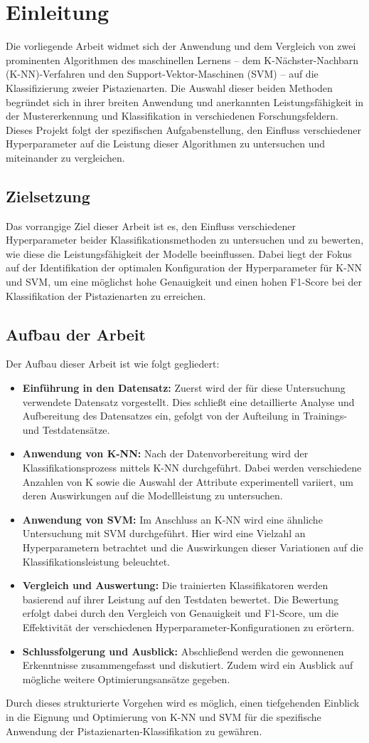 
\section{Einleitung}
Die vorliegende Arbeit widmet sich der Anwendung und dem Vergleich von zwei prominenten Algorithmen des maschinellen Lernens – dem K-Nächster-Nachbarn (K-NN)-Verfahren und den Support-Vektor-Maschinen (SVM) – auf die Klassifizierung zweier Pistazienarten.
Die Auswahl dieser beiden Methoden begründet sich in ihrer breiten Anwendung und anerkannten Leistungsfähigkeit in der Mustererkennung und Klassifikation in verschiedenen Forschungsfeldern.
Dieses Projekt folgt der spezifischen Aufgabenstellung, den Einfluss verschiedener Hyperparameter auf die Leistung dieser Algorithmen zu untersuchen und miteinander zu vergleichen.
\subsection*{Zielsetzung}
Das vorrangige Ziel dieser Arbeit ist es, den Einfluss verschiedener Hyperparameter beider Klassifikationsmethoden zu untersuchen und zu bewerten, wie diese die Leistungsfähigkeit der Modelle beeinflussen. Dabei liegt der Fokus auf der Identifikation der optimalen Konfiguration der Hyperparameter für K-NN und SVM, um eine möglichst hohe Genauigkeit und einen hohen F1-Score bei der Klassifikation der Pistazienarten zu erreichen.
\subsection*{Aufbau der Arbeit}
Der Aufbau dieser Arbeit ist wie folgt gegliedert:
\begin{itemize}
	\item \textbf{Einführung in den Datensatz:} Zuerst wird der für diese Untersuchung verwendete Datensatz vorgestellt. Dies schließt eine detaillierte Analyse und Aufbereitung des Datensatzes ein, gefolgt von der Aufteilung in Trainings- und Testdatensätze.
	\item \textbf{Anwendung von K-NN:} Nach der Datenvorbereitung wird der Klassifikationsprozess mittels K-NN durchgeführt. Dabei werden verschiedene Anzahlen von \glqq{}K\grqq{} sowie die Auswahl der Attribute experimentell variiert, um deren Auswirkungen auf die Modellleistung zu untersuchen.
	\item \textbf{Anwendung von SVM:} Im Anschluss an K-NN wird eine ähnliche Untersuchung mit SVM durchgeführt. Hier wird eine Vielzahl an Hyperparametern betrachtet und die Auswirkungen dieser Variationen auf die Klassifikationsleistung beleuchtet.
	\item \textbf{Vergleich und Auswertung:} Die trainierten Klassifikatoren werden basierend auf ihrer Leistung auf den Testdaten bewertet. Die Bewertung erfolgt dabei durch den Vergleich von Genauigkeit und F1-Score, um die Effektivität der verschiedenen Hyperparameter-Konfigurationen zu erörtern.
	\item \textbf{Schlussfolgerung und Ausblick:} Abschließend werden die gewonnenen Erkenntnisse zusammengefasst und diskutiert. Zudem wird ein Ausblick auf mögliche weitere Optimierungsansätze gegeben.
\end{itemize}

Durch dieses strukturierte Vorgehen wird es möglich, einen tiefgehenden Einblick in die Eignung und Optimierung von K-NN und SVM für die spezifische Anwendung der Pistazienarten-Klassifikation zu gewähren.

